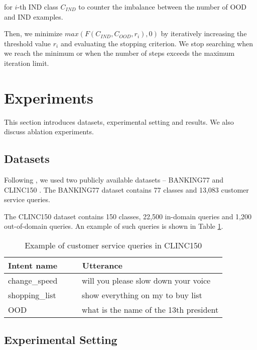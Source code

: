 \documentclass[runningheads]{llncs}
\begin{document}
for $i$-th IND class $C_{IND}$ to counter the imbalance between the number of OOD and IND examples.



Then, we minimize $max(F(C_{IND}, C_{OOD}, r_i), 0)$ by iteratively increasing the threshold value $r_i$ and evaluating the stopping criterion. We stop searching when we reach the minimum or when the number of steps exceeds the maximum iteration limit.









\section{Experiments}

This section introduces datasets, experimental setting and results. We also discuss ablation experiments.

\subsection{Datasets}
Following \cite{zhang2021adaptive_decision_boundary}, we used two publicly available datasets -- BANKING77 \cite{Casanueva2020_banking77} and CLINC150 \cite{larson2019evaluation_clinc_dataset}. The BANKING77 dataset contains 77 classes and 13,083 customer service queries.




The CLINC150 dataset contains 150 classes, 22,500 in-domain queries and 1,200 out-of-domain queries. 
An example of such queries is shown in Table \ref{tab:clinc150_example}.

\begin{table}[h]\centering
\caption{Example of customer service queries in CLINC150 \cite{larson2019evaluation_clinc_dataset}}
\label{tab:clinc150_example}
\begin{tabular}{l|l}
\textbf{Intent name} \,\,\,\, & \,\,\,\, \textbf{Utterance} \\ \hline
change\_speed \,\,\,\, & \,\,\,\,   will you please slow down your voice                \\
shopping\_list \,\,\,\, & \,\,\,\, show everything on my to buy list \\
OOD \,\,\,\, & \,\,\,\, what is the name of the 13th president       
\end{tabular}
\end{table}

\subsection{Experimental Setting}
\end{document}
